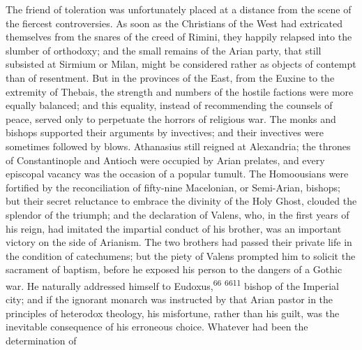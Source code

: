 
The friend of toleration was unfortunately placed at a distance
from the scene of the fiercest controversies. As soon as the
Christians of the West had extricated themselves from the snares
of the creed of Rimini, they happily relapsed into the slumber of
orthodoxy; and the small remains of the Arian party, that still
subsisted at Sirmium or Milan, might be considered rather as
objects of contempt than of resentment. But in the provinces of
the East, from the Euxine to the extremity of Thebais, the
strength and numbers of the hostile factions were more equally
balanced; and this equality, instead of recommending the counsels
of peace, served only to perpetuate the horrors of religious war.
The monks and bishops supported their arguments by invectives;
and their invectives were sometimes followed by blows. Athanasius
still reigned at Alexandria; the thrones of Constantinople and
Antioch were occupied by Arian prelates, and every episcopal
vacancy was the occasion of a popular tumult. The Homoousians
were fortified by the reconciliation of fifty-nine Macelonian, or
Semi-Arian, bishops; but their secret reluctance to embrace the
divinity of the Holy Ghost, clouded the splendor of the triumph;
and the declaration of Valens, who, in the first years of his
reign, had imitated the impartial conduct of his brother, was an
important victory on the side of Arianism. The two brothers had
passed their private life in the condition of catechumens; but
the piety of Valens prompted him to solicit the sacrament of
baptism, before he exposed his person to the dangers of a Gothic
war. He naturally addressed himself to Eudoxus,\textsuperscript{66} \textsuperscript{6611} bishop of
the Imperial city; and if the ignorant monarch was instructed by
that Arian pastor in the principles of heterodox theology, his
misfortune, rather than his guilt, was the inevitable consequence
of his erroneous choice. Whatever had been the determination of
